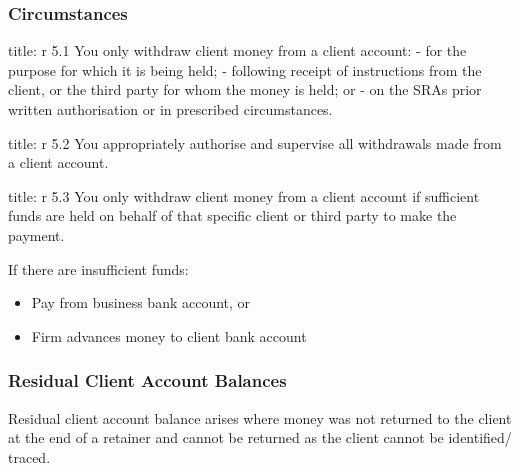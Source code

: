 \documentclass[
]{article}
\newenvironment{Shaded}{}{}
\newcommand{\NormalTok}[1]{#1}
\providecommand{\tightlist}{%
  \setlength{\itemsep}{0pt}\setlength{\parskip}{0pt}}
\begin{document}
\hypertarget{circumstances}{%
\subsubsection{Circumstances}\label{circumstances}}

\begin{Shaded}
\begin{Highlighting}[]
\NormalTok{title: r 5.1}
\NormalTok{You only withdraw client money from a client account:}
\NormalTok{{-} for the purpose for which it is being held;}
\NormalTok{{-} following receipt of instructions from the client, or the third party for whom the money is held; or}
\NormalTok{{-} on the SRA\textquotesingle{}s prior written authorisation or in prescribed circumstances.}
\end{Highlighting}
\end{Shaded}

\begin{Shaded}
\begin{Highlighting}[]
\NormalTok{title: r 5.2}
\NormalTok{You appropriately authorise and supervise all withdrawals made from a client account.}
\end{Highlighting}
\end{Shaded}

\begin{Shaded}
\begin{Highlighting}[]
\NormalTok{title: r 5.3}
\NormalTok{You only withdraw client money from a client account if sufficient funds are held on behalf of that specific client or third party to make the payment.}
\end{Highlighting}
\end{Shaded}

If there are insufficient funds:

\begin{itemize}
\tightlist
\item
  Pay from business bank account, or
\item
  Firm advances money to client bank account
\end{itemize}

\hypertarget{residual-client-account-balances}{%
\subsubsection{Residual Client Account
Balances}\label{residual-client-account-balances}}

Residual client account balance arises where money was not returned to
the client at the end of a retainer and cannot be returned as the client
cannot be identified/ traced.
\end{document}
